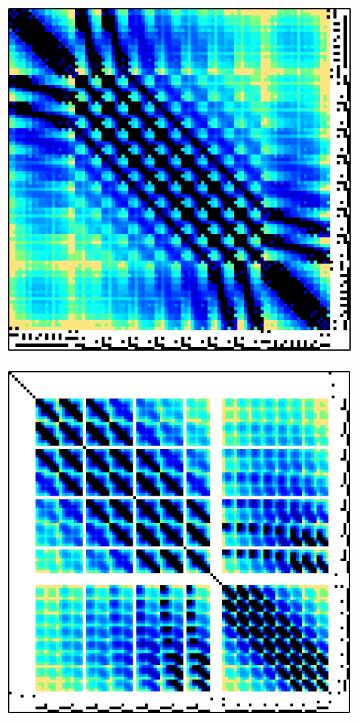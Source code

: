 \begin{figure}[ht!]
	\centering
	\begin{subfigure}[b]{0.48\textwidth}
		\centering
		\includegraphics[width=\textwidth]{images/ch03/input-matrices/bddcml-benchmark/poc-8_4_2-1.pdf}
		\caption{}
		\label{Figure:comparing-decomposers-and-solvers->bddcml-benchmark->matrices-used-for-benchmarks->examples-of-element-patterns-in-matrices->8-4-2-1}
	\end{subfigure}%
	\hfill
	\begin{subfigure}[b]{0.48\textwidth}
		\centering
		\includegraphics[width=\textwidth]{images/ch03/input-matrices/bddcml-benchmark/poc-8_4_2-2.pdf}

\end{subfigure}
\end{figure}
